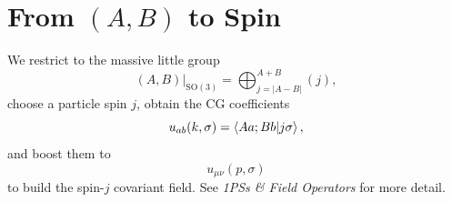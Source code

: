 \section{From \texorpdfstring{$(A, B)$}{(A,B)} to Spin}
We restrict to the massive little group
\begin{equation}
    (A, B) \Big|_{\mathrm{SO}(3)} = \bigoplus_{j = |A - B|}^{A + B} (j),
\end{equation}
choose a particle spin $j$, obtain the CG coefficients
\begin{equation}
    u_{a b}(k, \sigma) = \braket{A a; B b | j \sigma},
\end{equation}
and boost them to
\begin{equation}
    u_{\mu \nu}(p, \sigma)
\end{equation}
to build the spin-$j$ covariant field. See \textit{1PSs \& Field Operators} for more detail.

